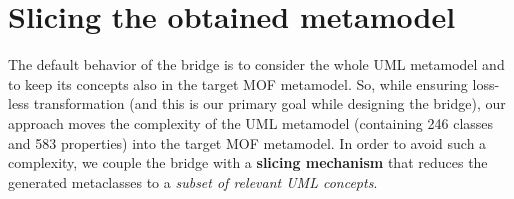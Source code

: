 \section{Slicing the obtained metamodel}\label{sec:slicing}

The default behavior of the bridge is to consider the whole UML metamodel and to keep its concepts also in the
target MOF metamodel. So, while ensuring loss-less transformation (and this is our primary goal while designing the bridge), our 
approach moves the complexity of the UML metamodel (containing 246 classes and 583 properties)
into the target MOF metamodel. In order to avoid such a complexity, we couple the bridge with a \textbf{slicing mechanism} that reduces the generated metaclasses to a \textit{subset of relevant UML concepts}.

